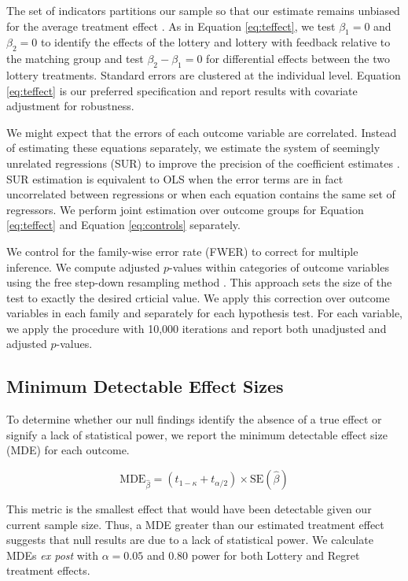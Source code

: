 \documentclass[11pt]{article}
\begin{document}
		The set of indicators partitions our sample so that our estimate remains unbiased for the average treatment effect \parencite{lin_agnostic_2013}. As in Equation \ref{eq:teffect}, we test $\beta_{1} = 0$ and $\beta_{2} = 0$ to identify the effects of the lottery and lottery with feedback relative to the matching group and test $\beta_{2} - \beta_{1} = 0$ for differential effects between the two lottery treatments. Standard errors are clustered at the individual level. Equation \ref{eq:teffect} is our preferred specification and report results with covariate adjustment for robustness.

		We might expect that the errors of each outcome variable are correlated. Instead of estimating these equations separately, we estimate the system of seemingly unrelated regressions (SUR) to improve the precision of the coefficient estimates \parencite{zellner_efficient_1962}. SUR estimation is equivalent to OLS when the error terms are in fact uncorrelated between regressions or when each equation contains the same set of regressors. We perform joint estimation over outcome groups for Equation \ref{eq:teffect} and Equation \ref{eq:controls} separately.

		We control for the family-wise error rate (FWER) to correct for multiple inference. We compute adjusted $p$-values within categories of outcome variables using the free step-down resampling method \parencite{westfall_resampling-based_1993,anderson_multiple_2008}. This approach sets the size of the test to exactly the desired crticial value. We apply this correction over outcome variables in each family and separately for each hypothesis test. For each variable, we apply the procedure with 10,000 iterations and report both unadjusted and adjusted $p$-values.

	\subsection{Minimum Detectable Effect Sizes}

		To determine whether our null findings identify the absence of a true effect or signify a lack of statistical power, we report the minimum detectable effect size (MDE) for each outcome.

		\begin{equation}
			\mathrm{MDE}_{\hat \beta} = (t_{1-\kappa} + t_{\alpha/2}) \times \mathrm{SE}(\hat \beta)
		\label{eq:mde} \end{equation}

		This metric is the smallest effect that would have been detectable given our current sample size. Thus, a MDE greater than our estimated treatment effect suggests that null results are due to a lack of statistical power. We calculate MDEs \textit{ex post} with $\alpha = 0.05$ and 0.80 power for both Lottery and Regret treatment effects.
\end{document}
